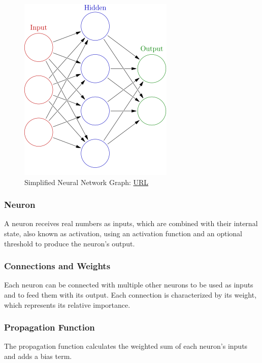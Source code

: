 \begin{figure} [H]
	\centering
	\includegraphics[scale=0.5]{../Images/CNNArchitectures/simplified-neural-network-graph.png}
	\decoRule
	\caption[Activation Function Graphs]{Simplified Neural Network Graph: \href{https://en.wikipedia.org/wiki/Artificial_neural_network}{URL}}
	\label{fig:simplified-neural-network-graph}
\end{figure}

\subsubsection{Neuron}
A neuron receives real numbers as inputs, which are combined with their internal state, also known as activation, using an activation function and an optional threshold to produce the neuron's output.

\subsubsection{Connections and Weights}
Each neuron can be connected with multiple other neurons to be used as inputs and to feed them with its output. Each connection is characterized by its weight, which represents its relative importance.

\subsubsection{Propagation Function}
The propagation function calculates the weighted sum of each neuron's inputs and adds a bias term.


